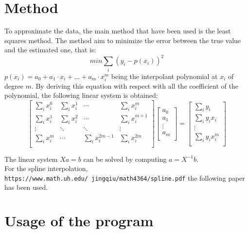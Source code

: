 \documentclass[12pt]{article}
\begin{document}
 \section{Method}
 To approximate the data, the main method that have been used is the least squares method. The method aim to minimize the error between the true value and the estimated one, that is:
 \begin{equation}
 min \sum_i (y_i - p(x_i))^2
 \end{equation}
 $p(x_i) = a_0 + a_1\cdot x_i+ \ldots +a_m\cdot x_i^m$ being the interpolant polynomial at $x_i$ of degree $m$.
 By deriving this equation with respect with all the coefficient of the polynomial, the following linear system is obtained:
 \begin{equation}
\left[ \begin{array}{cccc}
\sum_i x_i^0 & \sum_i x_i^1 & \cdots & \sum_i x_i^m \\
\sum_i x_i^1 & \sum_i x_i^2 & \cdots & \sum_i x_i^{m+1} \\
\vdots & \ddots & \ddots & \vdots \\
\sum_i x_i^m& \cdots & \sum_i x_i^{2m-1} & \sum_i x_i^{2m}\\
\end{array} \right]
\left[ \begin{array}{c}
a_0 \\
a_1\\
\vdots\\
a_m\\
\end{array} \right] = 
\left[ \begin{array}{c}
\sum_i y_i  \\
\sum_i y_i x_i\\
\vdots\\
\sum_i y_i x_i^m\\
\end{array} \right]
\end{equation}
 
The linear system $Xa=b$ can be solved by computing $a = X^{-1}b$.\\
For the spline interpolation, \texttt{https://www.math.uh.edu/~jingqiu/math4364/spline.pdf} the following paper has been used.
 
\section{Usage of the program}
\end{document}
